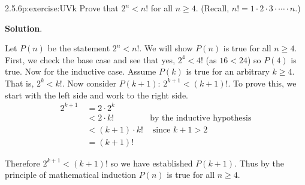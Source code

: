 \documentclass[twoside,11pt,]{book}
\newcommand{\blocktitlefont}{\relax}
\numberwithin{equation}{chapter}
\newcommand{\lt}{<}
\newcommand{\gt}{>}
\newcommand{\amp}{&}
\begin{document}
\begin{divisionsolution}{2.5.6}{}{p:exercise:UVk}%
Prove that \(2^n \lt n!\) for all \(n \ge 4\). (Recall, \(n! = 1\cdot 2 \cdot 3 \cdot \cdots\cdot n\).)%
\par\smallskip%
\noindent\textbf{\blocktitlefont Solution}.\quad{}\begin{solutionproof}
Let \(P(n)\) be the statement \(2^n \lt  n!\). We will show \(P(n)\) is true for all \(n \ge 4\). First, we check the base case and see that yes, \(2^4 \lt  4!\) (as \(16 \lt  24\)) so \(P(4)\) is true. Now for the inductive case. Assume \(P(k)\) is true for an arbitrary \(k \ge 4\). That is, \(2^k \lt  k!\). Now consider \(P(k+1)\): \(2^{k+1} \lt  (k+1)!\). To prove this, we start with the left side and work to the right side.%
\begin{align*}
2^{k+1}~ \amp = 2\cdot 2^k \amp\\
\amp \lt 2\cdot k! \amp \text{by the inductive hypothesis}\\
\amp \lt (k+1) \cdot k! \amp \text{ since } k+1 \gt 2\\
\amp = (k+1)! \amp
\end{align*}
%
\par
Therefore \(2^{k+1} \lt (k+1)!\) so we have established \(P(k+1)\). Thus by the principle of mathematical induction \(P(n)\) is true for all \(n \ge 4\).%
\end{solutionproof}
\end{divisionsolution}%
\end{document}
